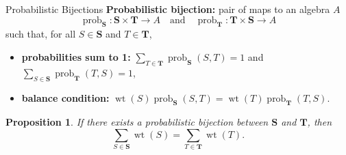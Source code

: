 \documentclass[aspectratio = 1609]{beamer}
\newtheorem{prop}{Proposition}
\theoremstyle{definition}
\theoremstyle{plain} %
\begin{document}
\begin{frame}{Probabilistic Bijections}
  \setlength{\abovedisplayskip}{2pt}
  \setlength{\belowdisplayskip}{2pt}
  \setlength{\abovedisplayshortskip}{2pt}
  \setlength{\belowdisplayshortskip}{2pt}
  \textbf{Probabilistic bijection:} pair of maps to an algebra \(A\) \hfill {\small \parencite{FS24}}
  \begin{equation*}
    \operatorname{prob}_{\mathbf{S}} \colon \mathbf{S} \times \mathbf{T} \to A
    \quad \text{and} \quad
    \operatorname{prob}_{\mathbf{T}} \colon \mathbf{T} \times \mathbf{S} \to A
  \end{equation*}
  such that, for all \(S \in \mathbf{S}\) and \(T \in \mathbf{T}\),
  \vspace{1em}
  \pause
  \begin{itemize}
    \item \textbf{probabilities sum to 1:}
    $ \displaystyle \sum_{T \in \mathbf{T}} \operatorname{prob}_{\mathbf{S}}(S, T) = 1 $
    and
    $ \displaystyle \sum_{S \in \mathbf{S}} \operatorname{prob}_{\mathbf{T}}(T, S) = 1 $,
    \pause
    \vspace{1em}
    \item \textbf{balance condition:}
    $ \operatorname{wt}(S) \operatorname{prob}_{\mathbf{S}}(S, T) = \operatorname{wt}(T) \operatorname{prob}_{\mathbf{T}}(T, S) $.
  \end{itemize}
  \pause
  \begin{prop}
    If there exists a probabilistic bijection between \(\mathbf{S}\) and \(\mathbf{T}\), then
    \[ \sum_{S \in \mathbf{S}} \operatorname{wt}(S) = \sum_{T \in \mathbf{T}} \operatorname{wt}(T). \]
  \end{prop}
\end{frame}
\end{document}
